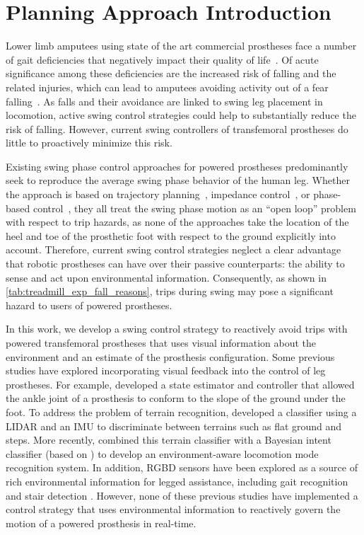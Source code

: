 \section{Planning Approach Introduction}\label{sec:swing_control_planning}
Lower limb amputees using state of the art commercial prostheses face a number
of gait deficiencies that negatively impact their quality of
life~\citep{gauthier1999enabling}. Of acute significance among these
deficiencies are the increased risk of falling and the related injuries, which
can lead to amputees avoiding activity out of a fear
falling~\citep{miller2001prevalence}.  As falls and their avoidance are linked
to swing leg placement in locomotion, active swing control strategies could help
to substantially reduce the risk of falling. However, current swing controllers
of transfemoral prostheses do little to proactively minimize this risk. 

Existing swing phase control approaches for powered prostheses predominantly
seek to reproduce the average swing phase behavior of the human leg. Whether the
approach is based on trajectory planning~\citep{lenzi2014speed}, impedance
control~\citep{sup2009preliminary}, or phase-based
control~\citep{quintero2016preliminary}, they all treat the swing phase motion
as an ``open loop'' problem with respect to trip hazards, as none of the
approaches take the location of the heel and toe of the prosthetic foot with
respect to the ground explicitly into account.  Therefore, current swing control
strategies neglect a clear advantage that robotic prostheses can have over their
passive counterparts: the ability to sense and act upon environmental
information.  Consequently, as shown in \cref{tab:treadmill_exp_fall_reasons},
trips during swing may pose a significant hazard to users of powered prostheses.

In this work, we develop a swing control strategy to reactively avoid trips with
powered transfemoral prostheses that uses visual information about the
environment and an estimate of the prosthesis configuration. Some previous
studies have explored incorporating visual feedback into the control of leg
prostheses. For example, \citet{scandaroli2009estimation} developed a state
estimator and controller that allowed the ankle joint of a prosthesis to conform
to the slope of the ground under the foot. To address the problem of terrain
recognition, \citet{zhang2011preliminary} developed a classifier using a LIDAR
and an IMU to discriminate between terrains such as flat ground and steps. More
recently, \citet{liu2016development} combined this terrain classifier with a
Bayesian intent classifier (based on \citep{du2012toward}) to develop an
environment-aware locomotion mode recognition system. In addition, RGBD sensors
have been explored as a source of rich environmental information for legged
assistance, including gait recognition \citep{massalin2017user} and stair
detection \citep{krausz2015depth,duan2018real}. However, none of these previous
studies have implemented a control strategy that uses environmental
information to reactively govern the motion of a powered prosthesis in
real-time. 

